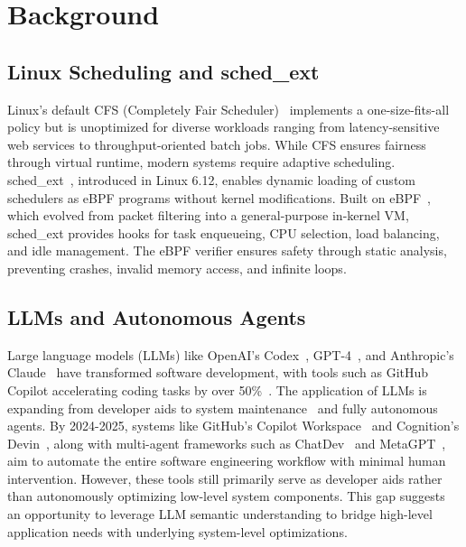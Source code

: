 \section{Background}
\label{sec:background}

\subsection{Linux Scheduling and sched\_ext}

Linux's default CFS (Completely Fair Scheduler)~\cite{wong2008cfs} implements a one-size-fits-all policy but is unoptimized for diverse workloads ranging from latency-sensitive web services to throughput-oriented batch jobs. While CFS ensures fairness through virtual runtime, modern systems require adaptive scheduling. sched\_ext~\cite{schedext2024}, introduced in Linux 6.12, enables dynamic loading of custom schedulers as eBPF programs without kernel modifications. Built on eBPF~\cite{mccanne1993bpf,gregg2019bpf}, which evolved from packet filtering into a general-purpose in-kernel VM, sched\_ext provides hooks for task enqueueing, CPU selection, load balancing, and idle management. The eBPF verifier ensures safety through static analysis, preventing crashes, invalid memory access, and infinite loops.

\subsection{LLMs and Autonomous Agents}

Large language models (LLMs) like OpenAI’s Codex~\cite{chen2021codex}, GPT-4~\cite{openai2023gpt4}, and Anthropic’s Claude~\cite{anthropic2024claude} have transformed software development, with tools such as GitHub Copilot accelerating coding tasks by over 50\%~\cite{peng2023impact}. The application of LLMs is expanding from developer aids to system maintenance~\cite{de2025llm} and fully autonomous agents. By 2024-2025, systems like GitHub's Copilot Workspace~\cite{dohmke2024copilotworkspace} and Cognition's Devin~\cite{sharma2024devin}, along with multi-agent frameworks such as ChatDev~\cite{qian2024chatdev} and MetaGPT~\cite{hong2023metagpt}, aim to automate the entire software engineering workflow with minimal human intervention. However, these tools still primarily serve as developer aids rather than autonomously optimizing low-level system components. This gap suggests an opportunity to leverage LLM semantic understanding to bridge high-level application needs with underlying system-level optimizations.